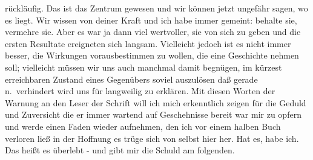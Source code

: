 \documentclass[
]{article}
\begin{document}
rückläufig. Das ist das Zentrum gewesen und wir können jetzt ungefähr
sagen, wo es liegt. Wir wissen von deiner Kraft und ich habe immer
gemeint: behalte sie, vermehre sie. Aber es war ja dann viel wertvoller,
sie von sich zu geben und die ersten Resultate ereigneten sich langsam.
Vielleicht jedoch ist es nicht immer besser, die Wirkungen
vorausbestimmen zu wollen, die eine Geschichte nehmen soll; vielleicht
müssen wir uns auch manchmal damit begnügen, im kürzest erreichbaren
Zustand eines Gegenübers soviel auszulösen daß gerade n.~verhindert wird
uns für langweilig zu erklären. Mit diesen Worten der Warnung an den
Leser der Schrift will ich mich erkenntlich zeigen für die Geduld und
Zuversicht die er immer wartend auf Geschehnisse bereit war mir zu
opfern und werde einen Faden wieder aufnehmen, den ich vor einem halben
Buch verloren ließ in der Hoffnung es trüge sich von selbst hier her.
Hat es, habe ich. Das heißt es überlebt - und gibt mir die Schuld am
folgenden.
\end{document}
